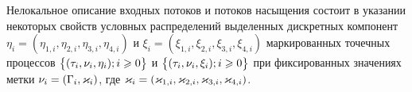 \documentclass[a4paper,12pt,russian]{extarticle}
\newcommand{\G}{\Gamma}
\begin{document}
Нелокальное описание входных потоков и потоков насыщения состоит в указании некоторых свойств условных распределений выделенных дискретных компонент $\eta_i=(\eta_{1,i},\eta_{2,i}, \eta_{3,i}, \eta_{4,i})$ и $\xi_i=(\xi_{1,i}, \xi_{2,i}, \xi_{3,i}, \xi_{4,i})$ маркированных точечных процессов $\left\{(\tau_i, \nu_i, \eta_i); i\geqslant 0\right\}$ и $\left\{(\tau_i, \nu_i, \xi_i); i\geqslant 0\right\}$ при фиксированных значениях метки $\nu_i = \left(\Gamma_i,\varkappa_i\right)$, где $\varkappa_i=(\varkappa_{1,i}, \varkappa_{2,i}, \varkappa_{3,i}, \varkappa_{4,i})$.
%
\end{document}
